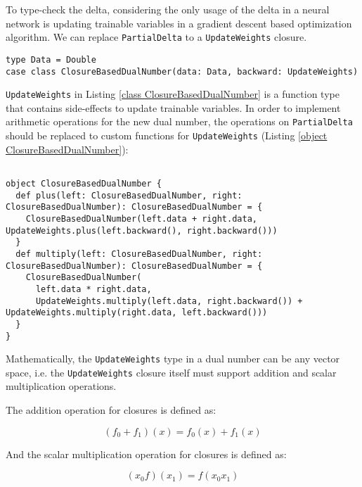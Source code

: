 To type-check the delta, considering the only usage of the delta in a neural network is updating \glspl{trainable variable} in a gradient descent based optimization algorithm. We can replace \lstinline{PartialDelta} to a \lstinline{UpdateWeights} closure.

\begin{lstlisting}[float={htbp},caption={Replacing \lstinline{PartialDelta} to a closure}, label={class ClosureBasedDualNumber}]
type Data = Double  
case class ClosureBasedDualNumber(data: Data, backward: UpdateWeights)
\end{lstlisting}

\lstinline{UpdateWeights} in Listing \ref{class ClosureBasedDualNumber} is a function type that contains side-effects to update \glspl{trainable variable}. In order to implement arithmetic operations for the new dual number, the operations on \lstinline{PartialDelta} should be replaced to custom functions for \lstinline{UpdateWeights} (Listing \ref{object ClosureBasedDualNumber}):

\begin{lstlisting}[float={htbp},caption={Replacing operations on \lstinline{PartialDelta} to custom functions for \lstinline{UpdateWeights}}, label={object ClosureBasedDualNumber}]  

object ClosureBasedDualNumber {
  def plus(left: ClosureBasedDualNumber, right: ClosureBasedDualNumber): ClosureBasedDualNumber = {
    ClosureBasedDualNumber(left.data + right.data, UpdateWeights.plus(left.backward(), right.backward()))
  }
  def multiply(left: ClosureBasedDualNumber, right: ClosureBasedDualNumber): ClosureBasedDualNumber = {
    ClosureBasedDualNumber(
      left.data * right.data,
      UpdateWeights.multiply(left.data, right.backward()) + UpdateWeights.multiply(right.data, left.backward()))
  }
}
\end{lstlisting}


Mathematically, the \lstinline{UpdateWeights} type in a dual number can be any vector space, i.e. the \lstinline{UpdateWeights} closure itself must support addition and scalar multiplication operations.

The addition operation for closures is defined as:

\begin{equation}
(f_0 + f_1)(x) = f_0(x) + f_1(x)
\end{equation}

And the scalar multiplication operation for closures is defined as:

\begin{equation}
(x_0f)(x_1) = f(x_0x_1)
\end{equation}

